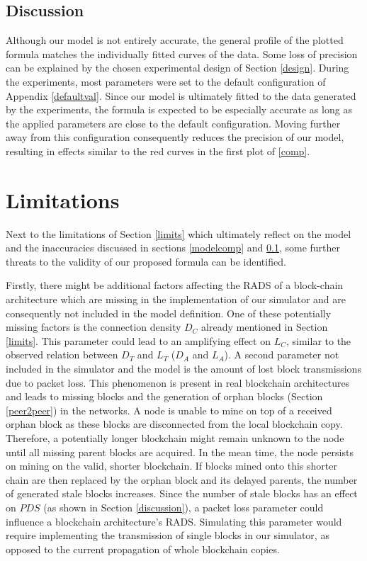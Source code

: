 \documentclass[a4paper,12pt,twoside]{report}
\begin{document}
\subsection{Discussion} \label{modeldisc}
Although our model is not entirely accurate, the general profile of the plotted formula matches the individually fitted curves of the data. Some loss of precision can be explained by the chosen experimental design of Section \ref{design}. During the experiments, most parameters were set to the default configuration of Appendix \ref{defaultval}. Since our model is ultimately fitted to the data generated by the experiments, the formula is expected to be especially accurate as long as the applied parameters are close to the default configuration. Moving further away from this configuration consequently reduces the precision of our model, resulting in effects similar to the red curves in the first plot of \autoref{comp}. 

\section{Limitations} \label{modellimit}
Next to the limitations of Section \ref{limits} which ultimately reflect on the model and the inaccuracies discussed in sections \ref{modelcomp} and \ref{modeldisc}, some further threats to the validity of our proposed formula can be identified. 

Firstly, there might be additional factors affecting the RADS of a block-chain architecture which are missing in the implementation of our simulator and are consequently not included in the model definition. One of these potentially missing factors is the connection density $D_C$ already mentioned in Section \ref{limits}. This parameter could lead to an amplifying effect on $L_C$, similar to the observed relation between $D_T$ and $L_T$ ($D_A$ and $L_A$). A second parameter not included in the simulator and the model is the amount of lost block transmissions due to packet loss. This phenomenon is present in real blockchain architectures and leads to missing blocks and the generation of orphan blocks (Section \ref{peer2peer}) in the networks. A node is unable to mine on top of a received orphan block as these blocks are disconnected from the local blockchain copy. Therefore, a potentially longer blockchain might remain unknown to the node until all missing parent blocks are acquired. In the mean time, the node persists on mining on the valid, shorter blockchain. If blocks mined onto this shorter chain are then replaced by the orphan block and its delayed parents, the number of generated stale blocks increases. Since the number of stale blocks has an effect on $PDS$ (as shown in Section \ref{discussion}), a packet loss parameter could influence a blockchain architecture's RADS. Simulating this parameter would require implementing the transmission of single blocks in our simulator, as opposed to the current propagation of whole blockchain copies.
\end{document}
